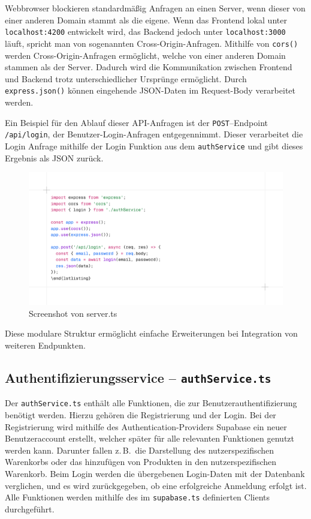 \documentclass[oneside]{ausarbeitung}
\begin{document}
Webbrowser blockieren standardmäßig Anfragen an einen Server, wenn dieser von einer anderen Domain stammt als die eigene. Wenn das Frontend lokal unter \texttt{localhost:4200} entwickelt wird, das Backend jedoch unter \texttt{localhost:3000} läuft, spricht man von sogenannten Cross-Origin-Anfragen.
Mithilfe von \texttt{cors()} werden Cross-Origin-Anfragen ermöglicht, welche von einer anderen Domain stammen als der Server. Dadurch wird die Kommunikation zwischen Frontend und Backend trotz unterschiedlicher Ursprünge ermöglicht.
Durch \texttt{express.json()} können eingehende JSON-Daten im Request-Body verarbeitet werden.

Ein Beispiel für den Ablauf dieser API-Anfragen ist der \texttt{POST}–Endpoint \texttt{/api/login}, der Benutzer-Login-Anfragen entgegennimmt. Dieser verarbeitet die Login Anfrage mithilfe der Login Funktion aus dem \texttt{authService} und gibt dieses Ergebnis als JSON zurück. 

\begin{figure}[H]
    \centering
    \includegraphics[width=\linewidth]{images/serverts.png}
    \caption{Screenshot von server.ts}
    \label{fig:rcheckout}
\end{figure}

Diese modulare Struktur ermöglicht einfache Erweiterungen bei Integration von weiteren Endpunkten. 

\subsection{Authentifizierungsservice – \texttt{authService.ts}}

Der \texttt{authService.ts} enthält alle Funktionen, die zur Benutzerauthentifizierung benötigt werden. Hierzu gehören die Registrierung und der Login. Bei der Registrierung wird mithilfe des Authentication-Providers Supabase ein neuer Benutzeraccount erstellt, welcher später für alle relevanten Funktionen genutzt werden kann. Darunter fallen z.\,B.\ die Darstellung des nutzerspezifischen Warenkorbs oder das hinzufügen von Produkten in den nutzerspezifischen Warenkorb. Beim Login werden die übergebenen Login-Daten mit der Datenbank verglichen, und es wird zurückgegeben, ob eine erfolgreiche Anmeldung erfolgt ist.
Alle Funktionen werden mithilfe des im \texttt{supabase.ts} definierten Clients durchgeführt.
\end{document}
